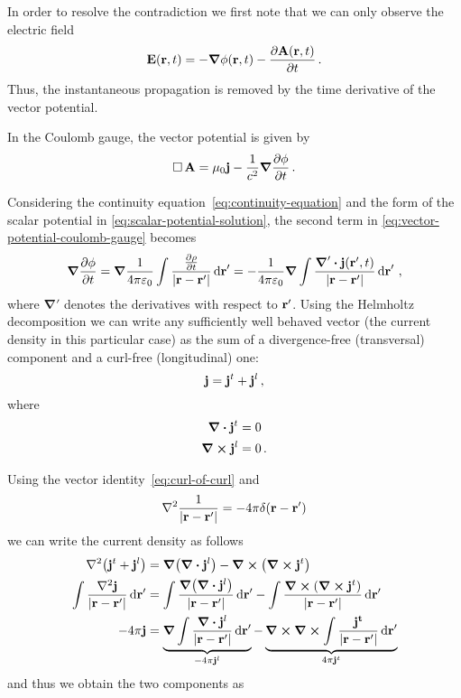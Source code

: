 \documentclass[12pt, class=report, crop=false]{standalone}
\begin{document}
In order to resolve the contradiction we first note that we can only observe
the electric field
\[
  \vb{E}(\vb{r}, t) = -\grad{\phi}(\vb{r},t) -\pdv{\vb{A}(\vb{r},t)}{t}\,.
\]
Thus, the instantaneous propagation is removed by the time derivative
of the vector potential.

In the Coulomb gauge, the vector potential is given by
\begin{equation}
  \label{eq:vector-potential-coulomb-gauge}
  \operatorname{\Box} \vb{A} = \mu_0 \vb{j} - \frac{1}{c^2} \grad{\pdv{\phi}{t}}\,.
\end{equation}

Considering the continuity equation~\eqref{eq:continuity-equation} and
the form of the scalar potential in \cref{eq:scalar-potential-solution},
the second term in \cref{eq:vector-potential-coulomb-gauge} becomes
\begin{equation}
  \label{eq:scalar-potential-continuity-equation}
  \grad{\pdv{\phi}{t}} = \grad \frac{1}{4\pi \varepsilon_0}
    \int \frac{\pdv{\rho}{t}}{|\vb{r}-\vb{r}'|} \dd{\vb{r}}'
    = - \frac{1}{4\pi \varepsilon_0} \grad
    \int \frac{\boldsymbol{\nabla}' \vdot \vb{j}(\vb{r}',t)}{|\vb{r}-\vb{r}'|} \dd{\vb{r}}'\,,
\end{equation}
where \(\boldsymbol{\nabla}'\) denotes the derivatives with respect to \(\vb{r}'\).
Using the Helmholtz decomposition we can write any sufficiently well behaved
vector (the current density in this particular case) as the sum
of a divergence-free (transversal) component and a curl-free (longitudinal) one:
\[
  \vb{j} = \vb{j}^t + \vb{j}^l \,,
\]
where
\begin{align*}
  \div{\vb{j}^t} &= 0 \\
  \curl{\vb{j}^l} &= 0 \,.
\end{align*}

Using the vector identity~\eqref{eq:curl-of-curl} and
\[
  \laplacian{\frac{1}{|\vb{r}-\vb{r}'|}} = -4\pi \delta(\vb{r}-\vb{r}')
\]
we can write the current density as follows
\begin{align*}
  \laplacian(\vb{j}^t + \vb{j}^l) &= \grad(\div{\vb{j}^l}) - \curl(\curl{\vb{j}^t}) \\
  \int \frac{\laplacian{\vb{j}}}{|\vb{r}-\vb{r}'|} \dd{\vb{r}'} &=
    \int \frac{\grad(\div{\vb{j}^l})}{|\vb{r}-\vb{r}'|} \dd{\vb{r}'}
    - \int \frac{\curl(\curl{\vb{j}^t})}{|\vb{r}-\vb{r}'|} \dd{\vb{r}'} \\
  -4\pi \vb{j} &=
  \underbrace{\grad \int \frac{\div{\vb{j}^l}}{|\vb{r}-\vb{r}'|} \dd{\vb{r}'}}_{-4\pi \vb{j}^l}
    - \underbrace{\curl \curl \int \frac{\vb{j^t}}{|\vb{r}-\vb{r}'|} \dd{\vb{r}'}}_{4\pi \vb{j}^t}
\end{align*}
and thus we obtain the two components as
\end{document}
